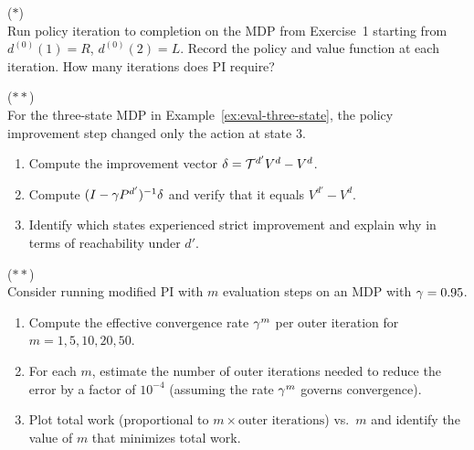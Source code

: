 \documentclass[11pt,a4paper]{article}
\begin{document}
\begin{exercise}
\textnormal{(\(*\))} \\
Run policy iteration to completion on the MDP from Exercise~1
starting from $d^{(0)}(1) = R$, $d^{(0)}(2) = L$. Record the
policy and value function at each iteration. How many iterations
does PI require?
\end{exercise}

\begin{exercise}
\textnormal{(\(**\))} \\
For the three-state MDP in Example~\ref{ex:eval-three-state}, the
policy improvement step changed only the action at state 3.
\begin{enumerate}[label=(\alph*)]
    \item Compute the improvement vector
    $\delta = \mathcal{T}^{d'} V^d - V^d$.
    \item Compute $(I - \gamma P^{d'})^{-1} \delta$ and verify
    that it equals $V^{d'} - V^d$.
    \item Identify which states experienced strict improvement and
    explain why in terms of reachability under $d'$.
\end{enumerate}
\end{exercise}

\begin{exercise}
\textnormal{(\(**\))} \\
Consider running modified PI with $m$ evaluation steps on an MDP
with $\gamma = 0.95$.
\begin{enumerate}[label=(\alph*)]
    \item Compute the effective convergence rate $\gamma^m$ per
    outer iteration for $m = 1, 5, 10, 20, 50$.
    \item For each $m$, estimate the number of outer iterations
    needed to reduce the error by a factor of $10^{-4}$ (assuming
    the rate $\gamma^m$ governs convergence).
    \item Plot total work (proportional to $m \times
    \text{outer iterations}$) vs.\ $m$ and identify the value of
    $m$ that minimizes total work.
\end{enumerate}
\end{exercise}
\end{document}
